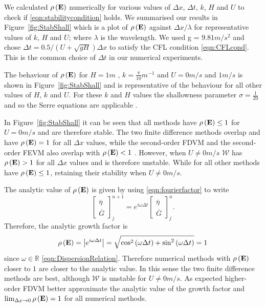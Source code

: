 We calculated $\rho\left(\mathbf{E} \right)$ numerically for various values of $\Delta x$, $\Delta t$, $k$, $H$ and $U$ to check if \eqref{eqn:stabilitycondition} holds. We summarised our results in Figure~\ref{fig:StabShall} which is a plot of $\rho\left(\mathbf{E}\right)$ against $\Delta x / \lambda$ for representative values of $k$, $H$ and $U$; where $\lambda$ is the wavelength. We used g = $9.81m/s^2$ and chose $\Delta t = 0.5 / \left(U + \sqrt{gH}\right) \Delta x$ to satisfy the CFL condition \eqref{eqn:CFLcond}. This is the common choice of $\Delta t$ in our numerical experiments.

The behaviour of $\rho\left(\mathbf{E}\right)$ for $H=1 m$ , $k = \frac{\pi}{10} m^{-1}$ and $U = 0 m/s$ and $1 m/s$ is shown in Figure~\ref{fig:StabShall} and is representative of the behaviour for all other values of $H$, $k$ and $U$. For these $k$ and $H$ values the shallowness parameter $\sigma = \frac{1}{20}$ and so the Serre equations are applicable \cite{Barthelemy-2004-315}. 

In Figure~\ref{fig:StabShall} it can be seen that all methods have $\rho\left(\mathbf{E} \right) \le 1$ for $U=0m/s$ and are therefore stable. The two finite difference methods overlap and have $\rho\left(\mathbf{E} \right) = 1$ for all $\Delta x$ values, while the second-order FDVM and the second-order FEVM also overlap with $\rho\left(\mathbf{E} \right) < 1$ . However, when $U \neq 0m/s$ $\mathcal{W}$ has $\rho\left(\mathbf{E} \right) > 1$ for all $\Delta x$ values and is therefore unstable. While for all other methods have $\rho\left(\mathbf{E} \right) \le 1$, retaining their stability when $U \neq 0m/s$.

The analytic value of $\rho\left(\mathbf{E}\right)$ is given by using \eqref{eqn:fourierfactor} to write
\begin{equation*}
\begin{bmatrix}
\overline{\eta} \\ \overline{G}
\end{bmatrix}^{n+1}_j = e^{i \omega \Delta t}\begin{bmatrix}
\overline{\eta} \\ \overline{G}
\end{bmatrix}^{n}_j.
\end{equation*}
Therefore, the analytic growth factor is
\begin{align}
\rho\left(\mathbf{E}\right) = \left| e^{i \omega \Delta t} \right| = \sqrt{\cos^2 \left(\omega \Delta t\right) + \sin^2 \left(\omega \Delta t\right)}  = 1
\end{align}
since $\omega \in \mathbb{R}$ \eqref{eqn:DispersionRelation}. Therefore numerical methods with $\rho\left(\mathbf{E}\right)$ closer to $1$ are closer to the analytic value. In this sense the two finite difference methods are best, although $\mathcal{W}$ is unstable for $U \neq 0m/s$. As expected higher-order FDVM better approximate the analytic value of the growth factor and $\lim_{\Delta x \rightarrow 0}\rho\left(\mathbf{E}\right) = 1$ for all numerical methods.

